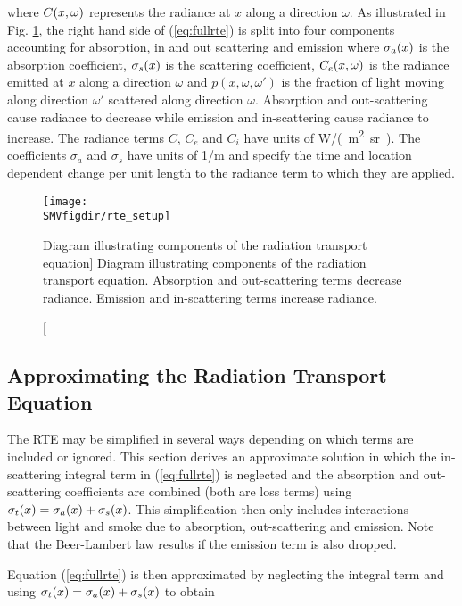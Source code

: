 \noindent where  $C(x,\omega)$ represents the  radiance at $x$ along a
direction $\omega$. As illustrated in Fig. \ref{figRadiance}, the
right hand side of (\ref{eq:fullrte}) is split into four
components accounting for absorption, in and out scattering and
emission where $\sigma_a(x)$ is the absorption coefficient, $\sigma_s(x)$ is
the scattering coefficient, $C_e(x,\omega)$ is the radiance emitted at $x$
along a direction $\omega$ and $p(x,\omega,\omega')$ is the
fraction of light moving along direction $\omega'$ scattered along
direction $\omega$. Absorption and out-scattering cause radiance
to decrease while emission and in-scattering cause radiance to
increase. The radiance terms $C$, $C_e$ and $C_i$ have units of
\si{W/(m^2.sr)}. The coefficients $\sigma_a$ and $\sigma_s$ have
units of \si{1/m} and specify the time and location dependent
change per unit length to the radiance term to which they are
applied.

\begin{figure}[bph]
\begin{center}
\texttt{[image: \\SMVfigdir/rte\_setup]}
\end{center}
\caption
[Diagram illustrating components of the radiation transport equation]
{Diagram illustrating components of the
radiation transport equation.  Absorption and out-scattering terms
decrease radiance.  Emission and in-scattering terms increase
radiance.} \label{figRadiance}
\end{figure}


\subsection{Approximating the Radiation Transport Equation}

The RTE may be simplified in several ways depending on which terms
are included or ignored.  This section derives an approximate
solution in which the in-scattering integral term in
(\ref{eq:fullrte}) is neglected and the absorption and
out-scattering coefficients are combined (both are loss terms)
using $\sigma_t(x)=\sigma_a(x)+\sigma_s(x)$.  This simplification then only includes
interactions between light and smoke due to absorption,
out-scattering and emission.  Note that the Beer-Lambert law
results if the emission term is also dropped.

Equation (\ref{eq:fullrte}) is then approximated by neglecting the
integral term and using $\sigma_t(x)=\sigma_a(x)+\sigma_s(x)$ to obtain

